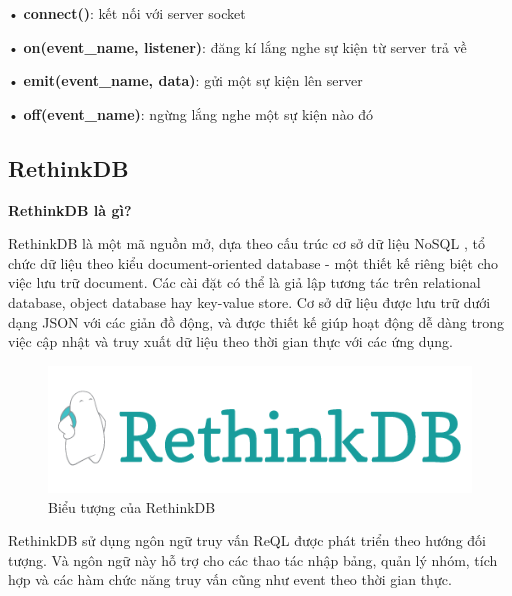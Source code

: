 • \textbf{connect()}: kết nối với server socket

• \textbf{on(event\_name, listener)}: đăng kí lắng nghe sự kiện từ server trả về

• \textbf{emit(event\_name, data)}: gửi một sự kiện lên server

• \textbf{off(event\_name)}: ngừng lắng nghe một sự kiện nào đó

\subsection{RethinkDB}

\textbf{RethinkDB là gì?}

RethinkDB là một mã nguồn mở, dựa theo cấu trúc cơ sở dữ liệu NoSQL \cite{c2nosql}, tổ chức dữ liệu theo kiểu document-oriented database - một thiết kế riêng biệt cho việc lưu trữ document. Các cài đặt có thể là giả lập tương tác trên relational database, object database hay key-value store. Cơ sở dữ liệu được lưu trữ dưới dạng JSON  với các giản đồ động, và được thiết kế giúp hoạt động dễ dàng trong việc cập nhật và truy xuất dữ liệu theo thời gian thực với các ứng dụng. \cite{c2rethink}

\begin{figure}[H]
	\centering    
	\includegraphics[width=1\textwidth]{rethinkdb}
	\caption[Biểu tượng của RethinkDB]{Biểu tượng của RethinkDB}
	\label{fig: rethinkdb}
\end{figure}

RethinkDB sử dụng ngôn ngữ truy vấn ReQL được phát triển theo hướng đối tượng. Và ngôn ngữ này hỗ trợ cho các thao tác nhập bảng, quản lý nhóm, tích hợp và các hàm chức năng truy vấn cũng như event theo thời gian thực.

